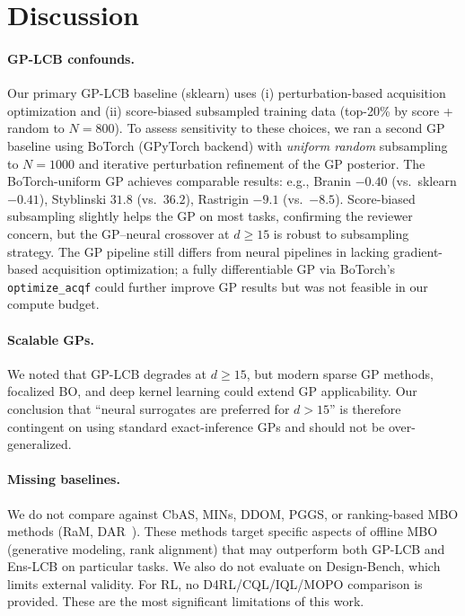 \documentclass{article}
\theoremstyle{plain}
\theoremstyle{remark}
\newcommand{\method}{Ens-LCB}
\begin{document}
\section{Discussion}
\label{sec:discussion}

\paragraph{GP-LCB confounds.}
Our primary GP-LCB baseline (sklearn) uses (i) perturbation-based acquisition optimization and (ii) score-biased subsampled training data (top-20\% by score + random to $N{=}800$).
To assess sensitivity to these choices, we ran a second GP baseline using BoTorch (GPyTorch backend) with \emph{uniform random} subsampling to $N{=}1000$ and iterative perturbation refinement of the GP posterior.
The BoTorch-uniform GP achieves comparable results: e.g., Branin $-0.40$ (vs.\ sklearn $-0.41$), Styblinski $31.8$ (vs.\ $36.2$), Rastrigin $-9.1$ (vs.\ $-8.5$).
Score-biased subsampling slightly helps the GP on most tasks, confirming the reviewer concern, but the GP--neural crossover at $d \geq 15$ is robust to subsampling strategy.
The GP pipeline still differs from neural pipelines in lacking gradient-based acquisition optimization; a fully differentiable GP via BoTorch's \texttt{optimize\_acqf} could further improve GP results but was not feasible in our compute budget.

\paragraph{Scalable GPs.}
We noted that GP-LCB degrades at $d \geq 15$, but modern sparse GP methods, focalized BO, and deep kernel learning could extend GP applicability.
Our conclusion that ``neural surrogates are preferred for $d > 15$'' is therefore contingent on using standard exact-inference GPs and should not be over-generalized.

\paragraph{Missing baselines.}
We do not compare against CbAS, MINs, DDOM, PGGS, or ranking-based MBO methods (RaM, DAR~\cite{tan2025ltr}).
These methods target specific aspects of offline MBO (generative modeling, rank alignment) that may outperform both GP-LCB and \method{} on particular tasks.
We also do not evaluate on Design-Bench, which limits external validity.
For RL, no D4RL/CQL/IQL/MOPO comparison is provided.
These are the most significant limitations of this work.
\end{document}
